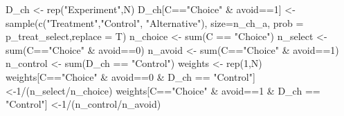 \documentclass[
]{article}
\newenvironment{Shaded}{\begin{snugshade}}{\end{snugshade}}
\newcommand{\AttributeTok}[1]{\textcolor[rgb]{0.77,0.63,0.00}{#1}}
\newcommand{\DecValTok}[1]{\textcolor[rgb]{0.00,0.00,0.81}{#1}}
\newcommand{\FunctionTok}[1]{\textcolor[rgb]{0.00,0.00,0.00}{#1}}
\newcommand{\NormalTok}[1]{#1}
\newcommand{\OtherTok}[1]{\textcolor[rgb]{0.56,0.35,0.01}{#1}}
\newcommand{\SpecialCharTok}[1]{\textcolor[rgb]{0.00,0.00,0.00}{#1}}
\newcommand{\StringTok}[1]{\textcolor[rgb]{0.31,0.60,0.02}{#1}}
\begin{document}
\begin{Shaded}
\begin{Highlighting}[]
\NormalTok{  D\_ch }\OtherTok{\textless{}{-}} \FunctionTok{rep}\NormalTok{(}\StringTok{"Experiment"}\NormalTok{,N)}
\NormalTok{  D\_ch[C}\SpecialCharTok{==}\StringTok{"Choice"} \SpecialCharTok{\&}\NormalTok{ avoid}\SpecialCharTok{==}\DecValTok{1}\NormalTok{] }\OtherTok{\textless{}{-}} \FunctionTok{sample}\NormalTok{(}\FunctionTok{c}\NormalTok{(}\StringTok{"Treatment"}\NormalTok{,}\StringTok{"Control"}\NormalTok{, }\StringTok{"Alternative"}\NormalTok{),}
                                         \AttributeTok{size=}\NormalTok{n\_ch\_a,}
                                         \AttributeTok{prob =}\NormalTok{ p\_treat\_select,}\AttributeTok{replace =}\NormalTok{ T)}
\NormalTok{  n\_choice }\OtherTok{\textless{}{-}} \FunctionTok{sum}\NormalTok{(C }\SpecialCharTok{==} \StringTok{"Choice"}\NormalTok{)}
\NormalTok{  n\_select }\OtherTok{\textless{}{-}} \FunctionTok{sum}\NormalTok{(C}\SpecialCharTok{==}\StringTok{"Choice"} \SpecialCharTok{\&}\NormalTok{ avoid}\SpecialCharTok{==}\DecValTok{0}\NormalTok{)}
\NormalTok{  n\_avoid }\OtherTok{\textless{}{-}} \FunctionTok{sum}\NormalTok{(C}\SpecialCharTok{==}\StringTok{"Choice"} \SpecialCharTok{\&}\NormalTok{ avoid}\SpecialCharTok{==}\DecValTok{1}\NormalTok{)}
\NormalTok{  n\_control }\OtherTok{\textless{}{-}} \FunctionTok{sum}\NormalTok{(D\_ch }\SpecialCharTok{==} \StringTok{"Control"}\NormalTok{)}
\NormalTok{  weights }\OtherTok{\textless{}{-}} \FunctionTok{rep}\NormalTok{(}\DecValTok{1}\NormalTok{,N)}
\NormalTok{  weights[C}\SpecialCharTok{==}\StringTok{"Choice"} \SpecialCharTok{\&}\NormalTok{ avoid}\SpecialCharTok{==}\DecValTok{0} \SpecialCharTok{\&}\NormalTok{ D\_ch }\SpecialCharTok{==} \StringTok{"Control"}\NormalTok{] }\OtherTok{\textless{}{-}}\DecValTok{1}\SpecialCharTok{/}\NormalTok{(n\_select}\SpecialCharTok{/}\NormalTok{n\_choice)}
\NormalTok{  weights[C}\SpecialCharTok{==}\StringTok{"Choice"} \SpecialCharTok{\&}\NormalTok{ avoid}\SpecialCharTok{==}\DecValTok{1} \SpecialCharTok{\&}\NormalTok{ D\_ch }\SpecialCharTok{==} \StringTok{"Control"}\NormalTok{] }\OtherTok{\textless{}{-}}\DecValTok{1}\SpecialCharTok{/}\NormalTok{(n\_control}\SpecialCharTok{/}\NormalTok{n\_avoid)}
  

\end{Highlighting}
\end{Shaded}
\end{document}
